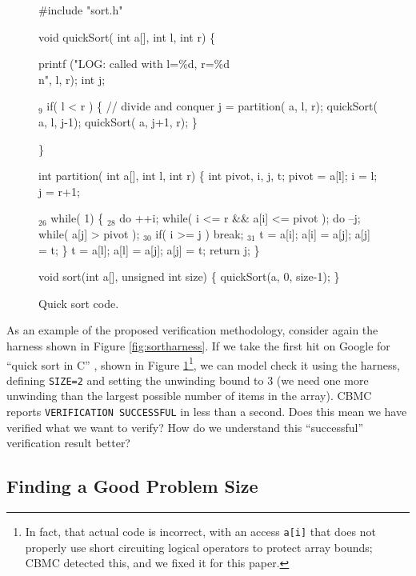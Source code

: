 \documentclass[conference]{IEEEtran}
\begin{document}
\begin{figure}
{\scriptsize
\begin{code}
 \#include "sort.h"

 void quickSort( int a[], int l, int r)
 \{

   printf ("LOG: called with l=\%d, r=\%d\\n", l, r); 
   int j;

{$_9$}  if( l < r ) 
     \{
       // divide and conquer
       j = partition( a, l, r);
       quickSort( a, l, j-1);
       quickSort( a, j+1, r);
     \}
  
 \}

 int partition( int a[], int l, int r) \{
   int pivot, i, j, t;
   pivot = a[l];
   i = l; j = r+1;
  
{$_{26}$} while( 1)
     \{
{$_{28}$}     do ++i; while( i <= r \&\& a[i] <= pivot );
       do --j; while( a[j] > pivot );
{$_{30}$}     if( i >= j ) break;
{$_{31}$}     t = a[i]; a[i] = a[j]; a[j] = t;
     \}
   t = a[l]; a[l] = a[j]; a[j] = t;
   return j;
 \}


 void sort(int a[], unsigned int size) \{
   quickSort(a, 0, size-1);
 \}
\end{code}
}
\caption{Quick sort code.}
\label{fig:qsort}
\end{figure}

As an example of the proposed verification methodology, consider again
the harness shown in Figure \ref{fig:sortharness}.  If we take the
first hit on Google for ``quick sort in C'' \cite{quicksortcode},
shown in Figure \ref{fig:qsort}\footnote{In fact, that actual code is
  incorrect, with an access {\tt a[i]} that does not properly use
  short circuiting logical operators to protect array bounds; CBMC
  detected this, and we fixed it for this paper.}, we can model check
it using the harness, defining {\tt SIZE=2} and setting the unwinding
bound to 3 (we need one more unwinding than the largest possible
number of items in the array).  CBMC reports {\tt VERIFICATION
  SUCCESSFUL} in less than a second.  Does this mean we have verified
what we want to verify?  How do we understand this ``successful''
verification result better?

\subsection{Finding a Good Problem Size}
\end{document}
